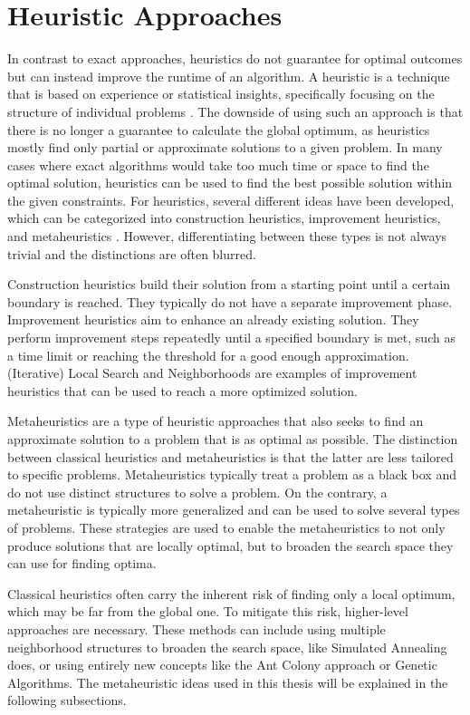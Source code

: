 \section{Heuristic Approaches}
\label{sec:metaHeuristics}

In contrast to exact approaches, heuristics do not guarantee for optimal outcomes but can instead improve the runtime of an algorithm.
A heuristic is a technique that is based on experience or statistical insights, specifically focusing on the structure of individual problems \cite{gendreau_handbook_2010}.
The downside of using such an approach is that there is no longer a guarantee to calculate the global optimum, as heuristics mostly find only partial or approximate solutions to a given problem. 
In many cases where exact algorithms would take too much time or space to find the optimal solution, heuristics can be used to find the best possible solution within the given constraints.
For heuristics, several different ideas have been developed, which can be categorized into construction heuristics, improvement heuristics, and metaheuristics \cite{laporte_5_2002,ropke_heuristic_2005}.
However, differentiating between these types is not always trivial and the distinctions are often blurred.

Construction heuristics build their solution from a starting point until a certain boundary is reached. 
They typically do not have a separate improvement phase.
Improvement heuristics aim to enhance an already existing solution.
They perform improvement steps repeatedly until a specified boundary is met, such as a time limit or reaching the threshold for a good enough approximation.
(Iterative) Local Search and Neighborhoods are examples of improvement heuristics that can be used to reach a more optimized solution.

Metaheuristics are a type of heuristic approaches that also seeks to find an approximate solution to a problem that is as optimal as possible.
The distinction between classical heuristics and metaheuristics is that the latter are less tailored to specific problems.
Metaheuristics typically treat a problem as a black box and do not use distinct structures to solve a problem.
On the contrary, a metaheuristic is typically more generalized and can be used to solve several types of problems.
These strategies are used to enable the metaheuristics to not only produce solutions that are locally optimal, but to broaden the search space they can use for finding optima.

Classical heuristics often carry the inherent risk of finding only a local optimum, which may be far from the global one.
To mitigate this risk, higher-level approaches are necessary.
These methods can include using multiple neighborhood structures to broaden the search space, like Simulated Annealing does, or using entirely new concepts like the Ant Colony approach or Genetic Algorithms. 
The metaheuristic ideas used in this thesis will be explained in the following subsections.



